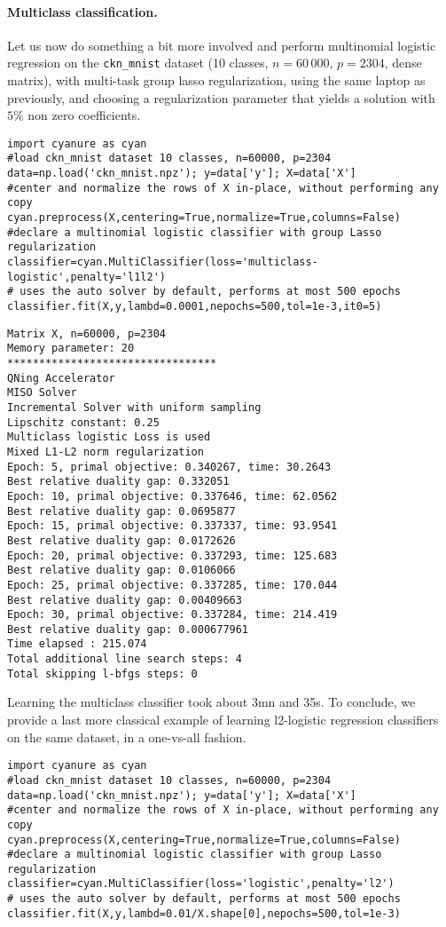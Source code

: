 \documentclass{article}
\begin{document}
\paragraph{Multiclass classification.}
Let us now do something a bit more involved and perform multinomial logistic regression on the
\texttt{ckn\_mnist} dataset (10 classes, $n=60\,000$, $p=2304$, dense matrix), with multi-task group lasso regularization,
using the same laptop as previously, and choosing a regularization parameter that yields a solution with $5\%$ non zero coefficients.
\begin{verbatim}
import cyanure as cyan
#load ckn_mnist dataset 10 classes, n=60000, p=2304
data=np.load('ckn_mnist.npz'); y=data['y']; X=data['X']
#center and normalize the rows of X in-place, without performing any copy
cyan.preprocess(X,centering=True,normalize=True,columns=False) 
#declare a multinomial logistic classifier with group Lasso regularization
classifier=cyan.MultiClassifier(loss='multiclass-logistic',penalty='l1l2')
# uses the auto solver by default, performs at most 500 epochs
classifier.fit(X,y,lambd=0.0001,nepochs=500,tol=1e-3,it0=5) 
\end{verbatim}
\begin{verbatim}
Matrix X, n=60000, p=2304
Memory parameter: 20
*********************************
QNing Accelerator
MISO Solver
Incremental Solver with uniform sampling
Lipschitz constant: 0.25
Multiclass logistic Loss is used
Mixed L1-L2 norm regularization
Epoch: 5, primal objective: 0.340267, time: 30.2643
Best relative duality gap: 0.332051
Epoch: 10, primal objective: 0.337646, time: 62.0562
Best relative duality gap: 0.0695877
Epoch: 15, primal objective: 0.337337, time: 93.9541
Best relative duality gap: 0.0172626
Epoch: 20, primal objective: 0.337293, time: 125.683
Best relative duality gap: 0.0106066
Epoch: 25, primal objective: 0.337285, time: 170.044
Best relative duality gap: 0.00409663
Epoch: 30, primal objective: 0.337284, time: 214.419
Best relative duality gap: 0.000677961
Time elapsed : 215.074
Total additional line search steps: 4
Total skipping l-bfgs steps: 0
\end{verbatim}
Learning the multiclass classifier took about 3mn and 35s. To conclude, we provide a last more classical example
of learning l2-logistic regression classifiers on the same dataset, in a one-vs-all fashion.
\begin{verbatim}
import cyanure as cyan
#load ckn_mnist dataset 10 classes, n=60000, p=2304
data=np.load('ckn_mnist.npz'); y=data['y']; X=data['X']
#center and normalize the rows of X in-place, without performing any copy
cyan.preprocess(X,centering=True,normalize=True,columns=False) 
#declare a multinomial logistic classifier with group Lasso regularization
classifier=cyan.MultiClassifier(loss='logistic',penalty='l2')
# uses the auto solver by default, performs at most 500 epochs
classifier.fit(X,y,lambd=0.01/X.shape[0],nepochs=500,tol=1e-3) 
\end{verbatim}
\end{document}
